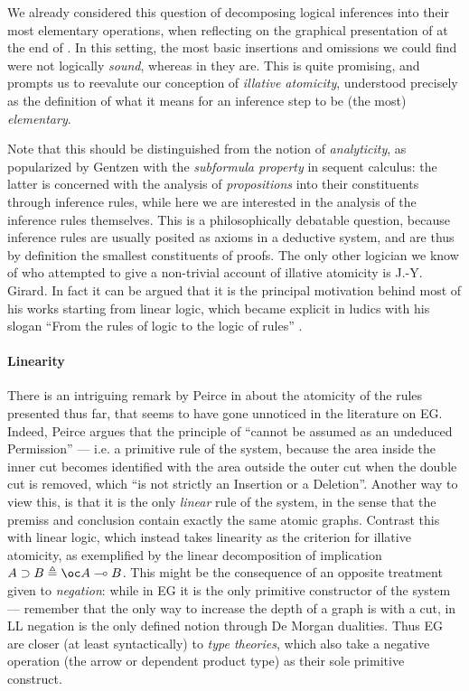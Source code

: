 We already considered this question of decomposing logical inferences into their
most elementary operations, when reflecting on the graphical presentation of
 at the end of . In this setting, the
most basic insertions and omissions we could find were not logically
\emph{sound}, whereas in  they are. This is quite promising, and
prompts us to reevalute our conception of \emph{illative atomicity}, understood
precisely as the definition of what it means for an inference step to be (the
most) \emph{elementary}.

Note that this should be distinguished from the notion of \emph{analyticity}, as
popularized by Gentzen with the \emph{subformula property} in sequent calculus:
the latter is concerned with the analysis of \emph{propositions} into their
constituents through inference rules, while here we are interested in the
analysis of the inference rules themselves. This is a philosophically debatable question,
because inference rules are usually posited as axioms in a deductive system, and
are thus by definition the smallest constituents of proofs. The only other
logician we know of who attempted to give a non-trivial account of illative
atomicity is J.-Y. Girard. In fact it can be argued that it is the principal
motivation behind most of his works starting from linear logic, which became
explicit in ludics with his slogan ``From the rules of logic to the logic of
rules'' \cite{girard_locus_2001}.

\paragraph{Linearity}

There is an intriguing remark by Peirce in
\cite[pp.~536--537]{peirce_prolegomena_1906} about the atomicity of the rules
presented thus far, that seems to have gone unnoticed in the literature on EG.
Indeed, Peirce argues that the principle of  ``cannot be
assumed as an undeduced Permission'' --- i.e. a primitive rule of the system,
because the area inside the inner cut becomes identified with the area outside
the outer cut when the double cut is removed, which ``is not strictly an
Insertion or a Deletion''. Another way to view this, is that it is the only
\emph{linear} rule of the system, in the sense that the premiss and conclusion
contain exactly the same atomic graphs. Contrast this with linear logic, which
instead takes linearity as the criterion for illative atomicity, as exemplified
by the linear decomposition of implication $A \limp B \defeq \oc A \multimap B$.
This might be the consequence of an opposite treatment given to \emph{negation}:
while in EG it is the only primitive constructor of the system --- remember that
the only way to increase the depth of a graph is with a cut, in LL negation is
the only defined notion through De Morgan dualities. Thus EG are closer (at
least syntactically) to \emph{type theories}, which also take a negative
operation (the arrow or dependent product type) as their sole primitive
construct.

